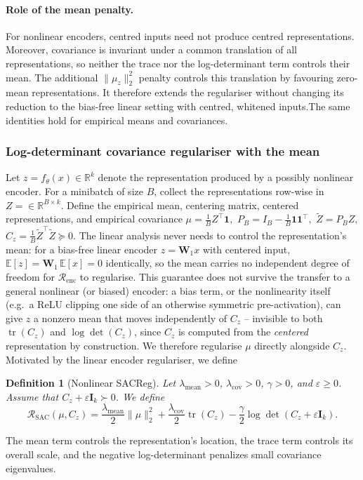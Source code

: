 \documentclass{article} %
\newcommand{\wa}{\mathbf{W}_1}
\newtheorem{definition}[theorem]{Definition}
\theoremstyle{remark}
\begin{document}
\paragraph{Role of the mean penalty.}
For nonlinear encoders, centred inputs need not produce centred
representations. Moreover, covariance is invariant under a common
translation of all representations, so neither the trace nor the
log-determinant term controls their mean. The additional
$\|\mu_z\|_2^2$ penalty controls this translation by favouring
zero-mean representations. It therefore extends the regulariser
without changing its reduction to the bias-free linear setting
with centred, whitened inputs.The same identities hold for empirical means and covariances.



\subsubsection{Log-determinant covariance regulariser with the mean }
\label{sec:logdet-covariance-regulariser}

Let $z=f_\theta(x)\in\mathbb{R}^{k}$ denote the representation produced by a possibly nonlinear
encoder. For a minibatch of size \(B\), collect the representations row-wise in $Z=\in\mathbb{R}^{B\times k}.$
Define the empirical mean, centering matrix, centered representations, and empirical covariance
$
\mu=\frac{1}{B}Z^\top\mathbf{1},
$ $
P_B
=
I_B-\frac{1}{B}\mathbf{1}\mathbf{1}^\top,
$ $
\widetilde Z=P_BZ,
$ $
C_z
=
\frac{1}{B}\widetilde Z^\top\widetilde Z
\succeq0.$ The linear analysis never needs to control the
representation's mean: for a bias-free linear encoder $z=\wa x$ with centered input, $\mathbb
E[z]=\wa\,\mathbb E[x]=0$ identically, so the mean carries no independent degree of freedom for
$\mathcal R_{\mathrm{enc}}$ to regularise. This guarantee does not survive the transfer to a
general nonlinear (or biased) encoder: a bias term, or the nonlinearity itself (e.g.\ a ReLU
clipping one side of an otherwise symmetric pre-activation), can give $z$ a nonzero mean that
moves independently of $C_z$ -- invisible to both $\operatorname{tr}(C_z)$ and $\log\det(C_z)$,
since $C_z$ is computed from the \emph{centered} representation by construction. We therefore
regularise $\mu$ directly alongside $C_z$. Motivated by the linear encoder regulariser, we define

\begin{definition}[Nonlinear SACReg]
\label{def:nonlinear-encoder-regulariser}
Let $\lambda_{\mathrm{mean}}>0$,
$\lambda_{\mathrm{cov}}>0$, $\gamma>0$, and $\varepsilon\geq0$.
Assume that $C_z+\varepsilon\mathbf{I}_k\succ0$.
We define
\begin{equation}
\mathcal{R}_{\mathrm{SAC}}(\mu,C_z)
=
\frac{\lambda_{\mathrm{mean}}}{2}\|\mu\|_2^2
+
\frac{\lambda_{\mathrm{cov}}}{2}\operatorname{tr}(C_z)
-
\frac{\gamma}{2}
\log\det\left(C_z+\varepsilon\mathbf{I}_k\right).
\label{eq:nonlinear-covariance-regulariser}
\end{equation}
\end{definition}
 The mean term controls the representation's location, the trace term controls its overall scale, and
the negative log-determinant penalizes small covariance eigenvalues.
\end{document}
